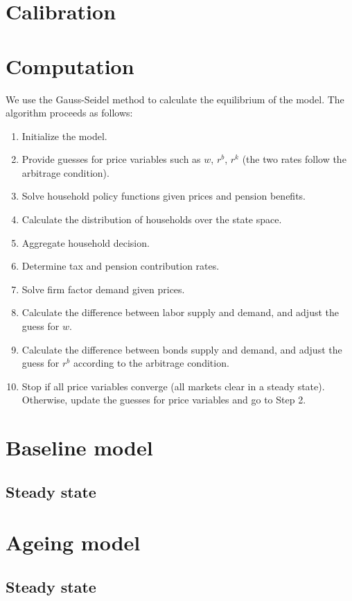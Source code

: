 \documentclass[12pt]{article}
\begin{document}
\section{Calibration}
\section{Computation}

We use the Gauss-Seidel method to calculate the equilibrium of the model. The algorithm proceeds as follows:
\begin{enumerate}
	\item Initialize the model.
	\item Provide guesses for price variables such as $w$, $r^b$, $r^k$ (the two rates follow the arbitrage condition).
	\item Solve household policy functions given prices and pension benefits.
	\item Calculate the distribution of households over the state space. 
	\item Aggregate household decision.
	\item Determine tax and pension contribution rates.
	\item Solve firm factor demand given prices. 
	\item Calculate the difference between labor supply and demand, and adjust the guess for $w$.
	\item Calculate the difference between bonds supply and demand, and adjust the guess for $r^b$ according to the arbitrage condition.
	\item Stop if all price variables converge (all markets clear in a steady state). Otherwise, update the guesses for price variables and go to Step 2. 
\end{enumerate}


\section{Baseline model}
\subsection{Steady state}

\section{Ageing model}
\subsection{Steady state}
\end{document}
